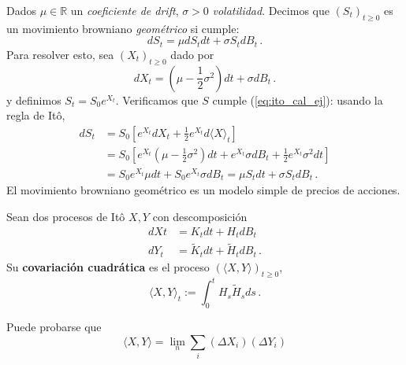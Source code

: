 \begin{example}
Dados $\mu \in \mathbb{R}$ un \textit{coeficiente de drift}, $\sigma > 0$  \textit{volatilidad}. Decimos que $(S_t)_{t \ge 0}$ es un movimiento browniano \textit{geométrico} si cumple: 
\begin{equation*}
    \label{eq:ito_cal_ej}
    \tag{$\triangle$}
    dS_t = \mu dS_t dt + \sigma S_t dB_t\,.
\end{equation*}
Para resolver esto, sea $(X_t)_{t \ge 0}$ dado por 
\begin{equation*}
        dX_t = (\mu - \frac{1}{2} \sigma^2) dt + \sigma d B_t\,.
\end{equation*}
y definimos $S_t = S_0 e^{X_t}$. Verificamos que $S$ cumple (\ref{eq:ito_cal_ej}): usando la regla de It\^{o}, 
\begin{align*}
    dS_t &= S_0 \left[e^{X_t} dX_t + \frac{1}{2} e^{X_t} d \langle X  \rangle_t \right] \\
    &= S_0 \left[e^{X_t} (\mu - \frac{1}{2} \sigma^2)dt + e^{X_t} \sigma dB_t + \frac{1}{2} e^{X_t} \sigma^2 dt    \right] \\
    &= S_0 e^{X_t} \mu dt + S_0 e^{X_t} \sigma dB_t = \mu S_t dt + \sigma S_t dB_t\,.
\end{align*}
El movimiento browniano geométrico es un modelo simple de precios de acciones.
\end{example}

\begin{definition}
Sean dos procesos de It\^{o} $X,Y$ con descomposición
\begin{align*}
    \label{eq:ito_cal_4}
    \tag{$\star\star$}
    dXt &= K_t dt + H_t dB_t \\ 
    dY_t&= \tilde{K} _t dt + \tilde{H}_t dB_t \,.
\end{align*}
Su \textbf{covariación cuadrática} es el proceso $(\langle X,Y \rangle)_{t \ge  0}$, 
\begin{equation*}
    \langle X,Y \rangle_t := \int_{0}^{t} H_s \tilde{H} _s  ds\,.
\end{equation*}
\end{definition}

\begin{remark}
Puede probarse que 
\begin{equation*}
    \langle X,Y \rangle = \lim_{n} \sum_{i} (\Delta X_i)(\Delta Y_i) 
\end{equation*}
\end{remark}

